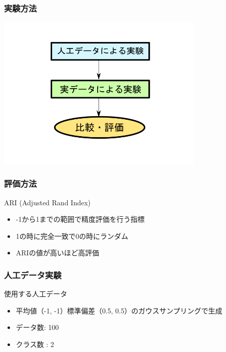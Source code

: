 \documentclass[13pt,dvipdfmx]{beamer}
\begin{document}
\begin{frame}\frametitle{実験方法}
\begin{center}
 \includegraphics[width=100mm]{experiment_process.png}
\end{center}
\end{frame}

\begin{frame}\frametitle{評価方法}
\begin{block}{ARI (Adjusted Rand Index)}
\begin{itemize}
 \item -1から1までの範囲で精度評価を行う指標
 \item 1の時に完全一致で0の時にランダム
 \item ARIの値が高いほど高評価
\end{itemize}
\end{block}
\begin{center}
\end{center}
\end{frame}

\begin{frame}\frametitle{人工データ実験}
  \begin{block}{使用する人工データ}
    \begin{itemize}
    \item 平均値（-1, -1）標準偏差（0.5, 0.5）のガウスサンプリングで生成
   　\item データ数: 100
    \item クラス数 : 2
    \end{itemize}
  \end{block}
\end{frame}
\end{document}
